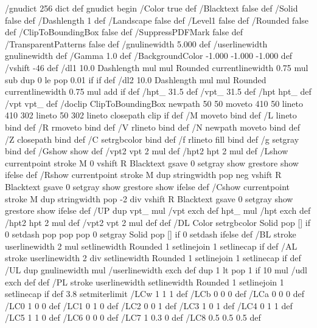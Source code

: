 /gnudict 256 dict def
gnudict begin
%
%
/Color true def
/Blacktext false def
/Solid false def
/Dashlength 1 def
/Landscape false def
/Level1 false def
/Rounded false def
/ClipToBoundingBox false def
/SuppressPDFMark false def
/TransparentPatterns false def
/gnulinewidth 5.000 def
/userlinewidth gnulinewidth def
/Gamma 1.0 def
/BackgroundColor {-1.000 -1.000 -1.000} def
%
/vshift -46 def
/dl1 {
  10.0 Dashlength mul mul
  Rounded { currentlinewidth 0.75 mul sub dup 0 le { pop 0.01 } if } if
} def
/dl2 {
  10.0 Dashlength mul mul
  Rounded { currentlinewidth 0.75 mul add } if
} def
/hpt_ 31.5 def
/vpt_ 31.5 def
/hpt hpt_ def
/vpt vpt_ def
/doclip {
  ClipToBoundingBox {
    newpath 50 50 moveto 410 50 lineto 410 302 lineto 50 302 lineto closepath
    clip
  } if
} def
%
%
%
/M {moveto} bind def
/L {lineto} bind def
/R {rmoveto} bind def
/V {rlineto} bind def
/N {newpath moveto} bind def
/Z {closepath} bind def
/C {setrgbcolor} bind def
/f {rlineto fill} bind def
/g {setgray} bind def
/Gshow {show} def   %
/vpt2 vpt 2 mul def
/hpt2 hpt 2 mul def
/Lshow {currentpoint stroke M 0 vshift R 
	Blacktext {gsave 0 setgray show grestore} {show} ifelse} def
/Rshow {currentpoint stroke M dup stringwidth pop neg vshift R
	Blacktext {gsave 0 setgray show grestore} {show} ifelse} def
/Cshow {currentpoint stroke M dup stringwidth pop -2 div vshift R 
	Blacktext {gsave 0 setgray show grestore} {show} ifelse} def
/UP {dup vpt_ mul /vpt exch def hpt_ mul /hpt exch def
  /hpt2 hpt 2 mul def /vpt2 vpt 2 mul def} def
/DL {Color {setrgbcolor Solid {pop []} if 0 setdash}
 {pop pop pop 0 setgray Solid {pop []} if 0 setdash} ifelse} def
/BL {stroke userlinewidth 2 mul setlinewidth
	Rounded {1 setlinejoin 1 setlinecap} if} def
/AL {stroke userlinewidth 2 div setlinewidth
	Rounded {1 setlinejoin 1 setlinecap} if} def
/UL {dup gnulinewidth mul /userlinewidth exch def
	dup 1 lt {pop 1} if 10 mul /udl exch def} def
/PL {stroke userlinewidth setlinewidth
	Rounded {1 setlinejoin 1 setlinecap} if} def
3.8 setmiterlimit
/LCw {1 1 1} def
/LCb {0 0 0} def
/LCa {0 0 0} def
/LC0 {1 0 0} def
/LC1 {0 1 0} def
/LC2 {0 0 1} def
/LC3 {1 0 1} def
/LC4 {0 1 1} def
/LC5 {1 1 0} def
/LC6 {0 0 0} def
/LC7 {1 0.3 0} def
/LC8 {0.5 0.5 0.5} def
